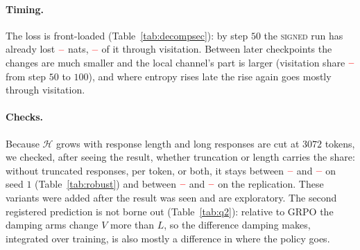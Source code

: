 \documentclass[runningheads]{llncs}
\newcommand{\Htraj}{\mathcal{H}}
\providecommand{\PENDING}{\textcolor{red}{\textbf{--}}}
\newcommand{\num}[1]{\ifcsname #1\endcsname\csname #1\endcsname\else\PENDING\fi}
\begin{document}
\paragraph{Timing.} The loss is front-loaded (Table~\ref{tab:decompsec}): by step $50$
the \textsc{signed} run has already lost $\num{DecSecSignedADH}$ nats,
$\num{DecSecSignedAShare}$ of it through visitation. Between later checkpoints the
changes are much smaller and the local channel's part is larger (visitation share
$\num{DecSecSignedBShare}$ from step $50$ to $100$), and where entropy rises late the
rise again goes mostly through visitation.

\paragraph{Checks.} Because $\Htraj$ grows with response length and long responses are
cut at $3072$ tokens, we checked, after seeing the result, whether truncation or length
carries the share: without truncated responses, per token, or both, it stays between
$\num{DecRobustMin}$ and $\num{DecRobustMax}$ on seed $1$ (Table~\ref{tab:robust}) and
between $\num{DecRepRobustMin}$ and $\num{DecRepRobustMax}$ on the replication. These
variants were added after the result was seen and are exploratory. The second
registered prediction is not borne out (Table~\ref{tab:q2}): relative to GRPO the
damping arms change $V$ more than $L$, so the difference damping makes, integrated over
training, is also mostly a difference in where the policy goes.
\end{document}

